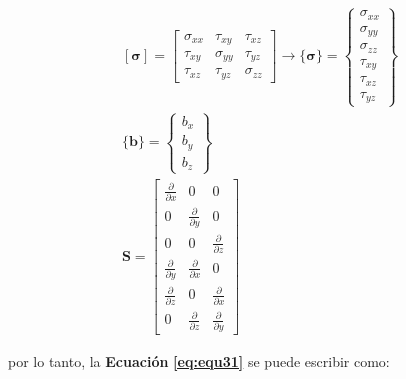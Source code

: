 \begin{ceqn} 
\begin{subequations} \label{eq:equ32} 
\begin{gather}
[\mathbf{\sigma}] = 
       \begin{bmatrix}
       \sigma_{xx} &  \tau_{xy}   &  \tau_{xz}    \\[0.3em]
       \tau_{xy}   &  \sigma_{yy} &  \tau_{yz}    \\[0.3em]
       \tau_{xz}   &  \tau_{yz}   &  \sigma_{zz}
       \end{bmatrix} 
       \rightarrow 
\{\mathbf{\sigma}\} = 
       \begin{Bmatrix} 
       \sigma_{xx}\\[0.3em]
       \sigma_{yy}\\[0.3em]
       \sigma_{zz}\\[0.3em]
       \tau_{xy}\\[0.3em]
       \tau_{xz}\\[0.3em]
       \tau_{yz}
       \end{Bmatrix} 
       \label{eq:equ32a} \\[10pt]
\{\mathbf{b}\} = 
      \begin{Bmatrix}
       b_{x} \\[0.3em]
       b_{y} \\[0.3em]
       b_{z}
       \end{Bmatrix} 
       \label{eq:equ32b} \\[10pt]
\mathbf{S} = 
       \begin{bmatrix}
       \frac{\partial}{\partial x} & 0 & 0 \\[0.3em]
       0 & \frac{\partial}{\partial y} & 0 \\[0.3em]
       0 & 0 & \frac{\partial}{\partial z}  \\[0.3em]
       \frac{\partial}{\partial y} & \frac{\partial}{\partial x} & 0 \\[0.3em]
       \frac{\partial}{\partial z} & 0 & \frac{\partial}{\partial x} \\[0.3em]
       0 & \frac{\partial}{\partial z} & \frac{\partial}{\partial y}
       \end{bmatrix}
       \label{eq:equ32c} 
\end{gather}  
\end{subequations} 
\end{ceqn}

por lo tanto, la \textbf{Ecuación} \textbf{\ref{eq:equ31}} se puede escribir como:

